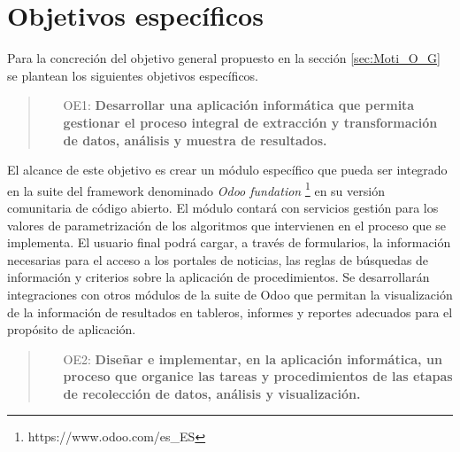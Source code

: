 \documentclass[12pt]{article}
\begin{document}
\section{Objetivos específicos}

Para la concreción del objetivo general propuesto en la sección \ref{sec:Moti_O_G} se plantean los siguientes objetivos específicos. 

    \begin{quote}
    \begin{itemize}
        \item [OE1:] \textbf{Desarrollar una aplicación informática que permita gestionar el proceso integral de extracción y transformación de datos, análisis y muestra de resultados.}
    \end{itemize}
    \end{quote}

        \vspace{0.3 cm}

        El alcance de este objetivo es crear un módulo específico que pueda ser integrado en la suite del framework denominado \textit{Odoo  fundation} \footnote{https://www.odoo.com/es\_ES} en su versión comunitaria de código abierto.
        El módulo contará con servicios gestión para los valores de parametrización de los algoritmos que intervienen en el proceso que se implementa. El usuario final podrá cargar, a través de formularios, la información necesarias para el acceso a los portales de noticias, las reglas de búsquedas de información y criterios sobre la aplicación de procedimientos. Se desarrollarán integraciones con otros módulos de la suite de Odoo que permitan la visualización de la información de resultados en tableros, informes y reportes adecuados para el propósito de aplicación.

        \vspace{0.3 cm}

        \begin{quote}
            \begin{itemize}
                \item [OE2:] \textbf{Diseñar e implementar, en la aplicación informática, un proceso que organice las tareas y procedimientos de las etapas de recolección de datos, análisis y visualización.} 
             \end{itemize}
        \end{quote}

        \vspace{0.3 cm}
\end{document}
